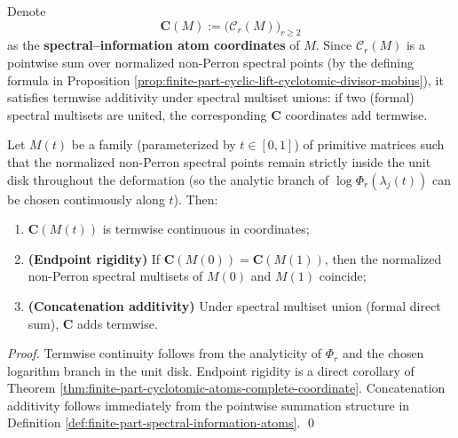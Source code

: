 \begin{definition}\label{def:finite-part-spectral-information-atoms}
Denote
\[
\mathbf{C}(M):=\bigl(\mathcal{C}_r(M)\bigr)_{r\ge2}
\]
as the \textbf{spectral--information atom coordinates} of \(M\).
Since \(\mathcal{C}_r(M)\) is a pointwise sum over normalized non-Perron spectral points (by the defining formula in Proposition \ref{prop:finite-part-cyclic-lift-cyclotomic-divisor-mobius}), it satisfies termwise additivity under spectral multiset unions: if two (formal) spectral multisets are united, the corresponding \(\mathbf{C}\) coordinates add termwise.
\end{definition}

\begin{theorem}\label{thm:finite-part-cyclotomic-atoms-homotopy-additive}
Let \(M(t)\) be a family (parameterized by \(t\in[0,1]\)) of primitive matrices such that the normalized non-Perron spectral points remain strictly inside the unit disk throughout the deformation (so the analytic branch of \(\log\Phi_r(\lambda_j(t))\) can be chosen continuously along \(t\)).
Then:
\begin{enumerate}
  \item \(\mathbf{C}(M(t))\) is termwise continuous in coordinates;
  \item \textbf{(Endpoint rigidity)} If \(\mathbf{C}(M(0))=\mathbf{C}(M(1))\), then the normalized non-Perron spectral multisets of \(M(0)\) and \(M(1)\) coincide;
  \item \textbf{(Concatenation additivity)} Under spectral multiset union (formal direct sum), \(\mathbf{C}\) adds termwise.
\end{enumerate}
\end{theorem}
\begin{proof}
Termwise continuity follows from the analyticity of \(\Phi_r\) and the chosen logarithm branch in the unit disk.
Endpoint rigidity is a direct corollary of Theorem \ref{thm:finite-part-cyclotomic-atoms-complete-coordinate}.
Concatenation additivity follows immediately from the pointwise summation structure in Definition \ref{def:finite-part-spectral-information-atoms}. \qed
\end{proof}
